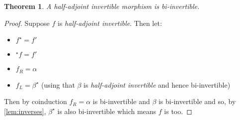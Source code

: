 \documentclass{article}
\newtheorem{theorem}{Theorem}
\theoremstyle{definition}
\theoremstyle{examplestyle}
\newcommand{\linv}[1]{{}^\star\!#1}
\newcommand{\rinv}[1]{#1^\star}
\begin{document}
\begin{theorem}
  A \emph{half-adjoint invertible} morphism is bi-invertible.
\end{theorem}
\begin{proof}
  Suppose \(f\) is \emph{half-adjoint invertible}. Then let:
  \begin{itemize}
  \item \(\rinv f = {f'}\)
  \item \(\linv f = {f'}\)
  \item \(f_R = \alpha\)
  \item \(f_L = \rinv \beta\) (using that \(\beta\) is \emph{half-adjoint invertible} and hence bi-invertible)
  \end{itemize}
  Then by coinduction \(f_R = \alpha\) is bi-invertible and \(\beta\) is bi-invertible and so, by \cref{lem:inverses}, \(\rinv \beta\) is also bi-invertible which means \(f\) is too.
\end{proof}
\end{document}
